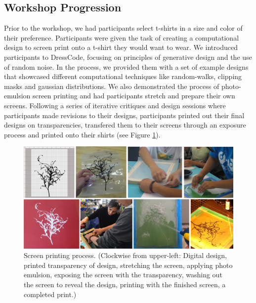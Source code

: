 \documentclass{sigchi}
\begin{document}
\subsection{Workshop Progression}
Prior to the workshop, we had participants select t-shirts in a size and color of their preference. Participants were given the task of creating a computational design to screen print onto a t-shirt they would want to wear. We introduced participants to DressCode, focusing on principles of generative design and the use of random noise. In the process, we provided them with a set of example designs that showcased different computational techniques like random-walks, clipping masks and gaussian distributions. We also demonstrated the process of photo-emulsion screen printing and had participants stretch and prepare their own screens. Following a series of iterative critiques and design sessions where participants made revisions to their designs, participants printed out their final designs on transparencies, transfered them to their screens through an exposure process and printed onto their shirts (see Figure \ref{fig:screen_printing_process}).
\begin{center}
\begin{figure}[h!]
\includegraphics[width=\columnwidth]{images/screen_printing_process.png}
\caption{Screen printing process. (Clockwise from upper-left: Digital design, printed transparency of design, stretching the screen, applying photo emulsion, exposing the screen with the transparency, washing out the screen to reveal the design, printing with the finished screen, a completed print.) }
\label{fig:screen_printing_process}
\end{figure}
\end{center}
\vspace{-20pt}
\end{document}
